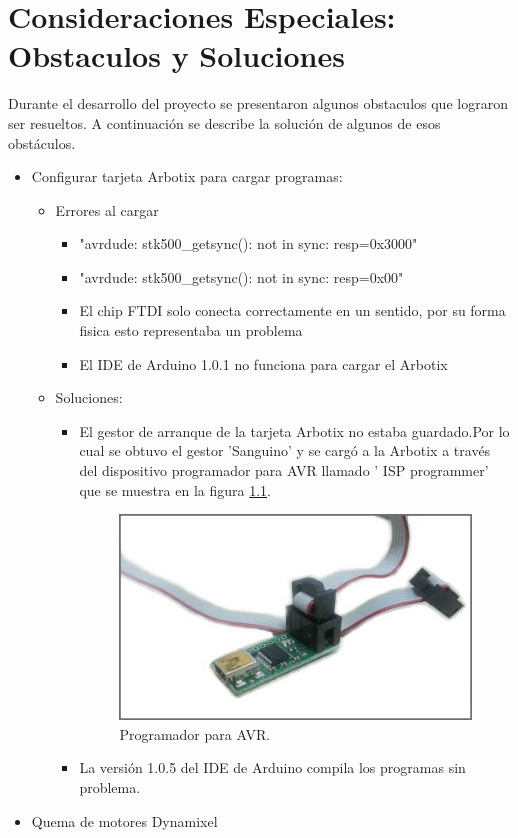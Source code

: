 \chapter{Consideraciones Especiales: Obstaculos y Soluciones} \label{chapter:consideraciones}

Durante el desarrollo del proyecto se presentaron algunos obstaculos que lograron ser resueltos. A continuación se describe la solución de algunos de esos obstáculos. 
\begin{itemize}
\item Configurar tarjeta Arbotix para cargar programas:
	\begin{itemize}
	\item Errores al cargar
	\begin{itemize}
		\item "avrdude: stk500\_getsync(): not in sync: resp=0x3000"

		\item "avrdude: stk500\_getsync(): not in sync: resp=0x00"

		\item El chip FTDI solo conecta correctamente en un sentido, por su forma fisica esto representaba un problema
		\item El IDE de Arduino 1.0.1 no funciona para cargar el Arbotix
	\end{itemize}
	\item Soluciones:
	\begin{itemize}
		\item El gestor de arranque de la tarjeta Arbotix no estaba guardado.Por lo cual se obtuvo el gestor 'Sanguino' y se cargó a la Arbotix a través del dispositivo programador para AVR llamado ' ISP programmer' que se muestra en la figura \ref{fig:ISPprog}. 

	\begin{figure}[hbtp]
	\centering
	\includegraphics[scale=0.3]{imagenes/ISP.jpg}
	\caption{Programador para AVR.}
	\label{fig:ISPprog}
	\end{figure}
		\item La versión 1.0.5 del IDE de Arduino compila los programas sin problema. 
	\end{itemize}
	\end{itemize}
 \item Quema de motores Dynamixel
\end{itemize}

